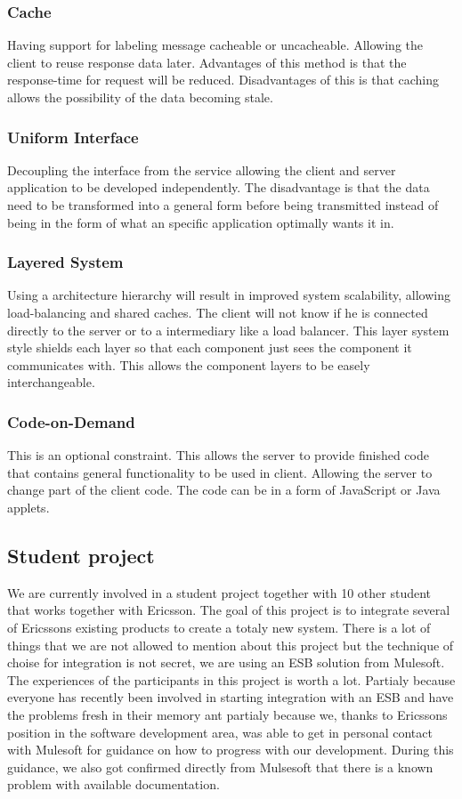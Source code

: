 \documentclass{llncs}
\begin{document}
\subsubsection{Cache}
Having support for labeling message cacheable or uncacheable. Allowing the client  to reuse response data later. Advantages of this method is that the response-time for request will be reduced. Disadvantages of this is that caching allows the possibility of the data becoming stale.

\subsubsection{Uniform Interface}
Decoupling the interface from the service allowing the client and server application to be developed  independently. The disadvantage is that the data need to be transformed into a general form before being transmitted instead of being in the form of what an specific application optimally wants it in.

\subsubsection{Layered System}
Using a architecture hierarchy will result in improved system scalability, allowing load-balancing and shared caches. The client will not know if he is connected directly to the server or to a intermediary like a load balancer. This layer system style shields each layer so that each component just sees the component it communicates with. This allows the component layers to be easely interchangeable.

\subsubsection{Code-on-Demand}
This is an optional constraint. This allows the server to provide finished code that contains general functionality to be used in client. Allowing the server to change part of the client code. The code can be in a form of JavaScript or Java applets.

\subsection{Student project}
We are currently involved in a student project together with 10 other student that works together with Ericsson. The goal of this project is to integrate several of Ericssons existing products to create a totaly new system. There is a lot of things that we are not allowed to mention about this project but the technique of choise for integration is not secret, we are using an ESB solution from Mulesoft. The experiences of the participants in this project is worth a lot. Partialy because everyone has recently been involved in starting integration with an ESB and have the problems fresh in their memory ant partialy because we, thanks to Ericssons position in the software development area, was able to get in personal contact with Mulesoft for guidance on how to progress with our development. During this guidance, we also got confirmed directly from Mulsesoft that there is a known problem with available documentation.
\end{document}
